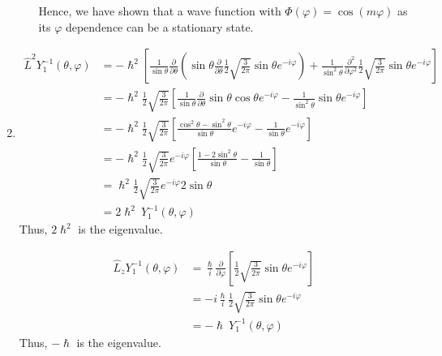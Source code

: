 \documentclass[10pt]{article}
\begin{document}
\begin{enumerate}
\begin{enumerate}
      Hence, we have shown that a wave function with $ \Phi \left( \varphi \right) = \cos \left( m \varphi \right) $ as its $ \varphi $ dependence can be a stationary state.
  \end{enumerate}
  \item 
    \begin{align*}
      \hat{L}^2 Y_{1}^{-1}\left( \theta, \varphi \right) &= - \hslash^2 \left[ \frac{1}{\sin \theta} \frac{\partial }{\partial \theta} \left( \sin \theta \frac{\partial }{\partial \theta} \frac{1}{2} \sqrt{\frac{3}{2\pi}} \sin \theta e ^ {-i \varphi} \right) + \frac{1}{\sin ^2 \theta} \frac{\partial ^2}{\partial \varphi^2} \frac{1}{2}\sqrt{\frac{3}{2\pi}} \sin \theta e ^ {-i \varphi}\right] \\
      &=  - \hslash^2 \frac{1}{2} \sqrt{\frac{3}{2\pi}} \left[ \frac{1}{\sin \theta} \frac{\partial }{\partial \theta} \sin \theta \cos \theta e ^ {-i \varphi} - \frac{1}{\sin ^2 \theta} \sin \theta e ^ {-i \varphi}\right] \\
      &=  - \hslash^2 \frac{1}{2} \sqrt{\frac{3}{2\pi}} \left[ \frac{\cos^2\theta-\sin^2\theta}{\sin \theta} e ^ {-i \varphi} - \frac{1}{\sin \theta} e ^ {-i \varphi}\right] \\
      &=  - \hslash^2 \frac{1}{2} \sqrt{\frac{3}{2\pi}} e ^ {-i\varphi}\left[ \frac{1-2\sin^2\theta}{\sin \theta} - \frac{1}{\sin \theta} \right] \\
      &=  \hslash^2 \frac{1}{2} \sqrt{\frac{3}{2\pi}} e ^ {-i\varphi} 2 \sin\theta \\
      &= 2 \hslash^2 ~ Y_{1}^{-1} \left( \theta, \varphi \right)
    \end{align*}
    Thus, $ 2 \hslash ^2 $ is the eigenvalue.

    \begin{align*}
      \hat{L}_{z} Y_{1}^{-1}\left( \theta, \varphi \right) &= \frac{\hslash}{i} \frac{\partial }{\partial \varphi} \left[ \frac{1}{2} \sqrt{\frac{3}{2\pi}} \sin \theta e ^ {-i \varphi}\right] \\
      &= -i \frac{\hslash}{i} \frac{1}{2} \sqrt{\frac{3}{2\pi}} \sin \theta e ^ {-i \varphi} \\
      &= - \hslash ~ Y_{1}^{-1}\left( \theta, \varphi \right)
    \end{align*}
    Thus, $ -\hslash $ is the eigenvalue.


\end{enumerate}
\end{document}
